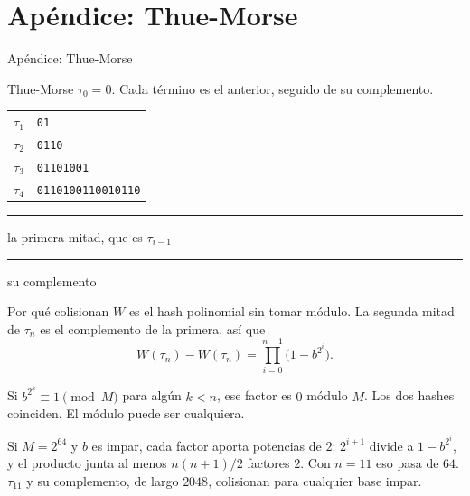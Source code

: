 \appendix
\section{Apéndice: Thue-Morse}

\begin{frame}
  \vspace{1.5cm}
  \centering
  {\LARGE Apéndice: Thue-Morse}
\end{frame}

\begin{frame}{Thue-Morse}
  \(\tau_0 = 0\).
  Cada término es el anterior, seguido de su complemento.

  \vspace{0.7em}
  \begin{center}
  \renewcommand{\arraystretch}{1.35}
  \begin{tabular}{@{}r@{\quad}l@{}}
    \(\tau_1\) & \textcolor{shared}{\texttt{0}}\hspace{0.45em}\textcolor{tail}{\texttt{1}} \\
    \(\tau_2\) & \textcolor{shared}{\texttt{01}}\hspace{0.45em}\textcolor{tail}{\texttt{10}} \\
    \(\tau_3\) & \textcolor{shared}{\texttt{0110}}\hspace{0.45em}\textcolor{tail}{\texttt{1001}} \\
    \(\tau_4\) & \textcolor{shared}{\texttt{01101001}}\hspace{0.45em}\textcolor{tail}{\texttt{10010110}}
  \end{tabular}
  \end{center}

  \vspace{0.6em}
  {\color{shared}\rule{0.7em}{0.7em}} la primera mitad, que es \(\tau_{i-1}\)
  \qquad
  {\color{tail}\rule{0.7em}{0.7em}} su complemento
\end{frame}

\begin{frame}{Por qué colisionan}
  \(W\) es el hash polinomial sin tomar módulo.
  La segunda mitad de \(\tau_n\) es el complemento de la primera, así que
  \[
    W(\overline{\tau_n}) - W(\tau_n)
      = \prod_{i=0}^{n-1} \bigl(1 - b^{2^{i}}\bigr).
  \]

  Si \(b^{2^{k}} \equiv 1 \pmod{M}\) para algún \(k < n\), ese factor es \(0\) módulo \(M\).
  Los dos hashes coinciden. El módulo puede ser cualquiera.

  \medskip
  Si \(M = 2^{64}\) y \(b\) es impar, cada factor aporta potencias de \(2\):
  \(2^{i+1}\) divide a \(1 - b^{2^{i}}\), y el producto junta al menos \(n(n+1)/2\) factores \(2\).
  Con \(n = 11\) eso pasa de \(64\).
  \(\tau_{11}\) y su complemento, de largo \(2048\), colisionan para cualquier base impar.
\end{frame}

